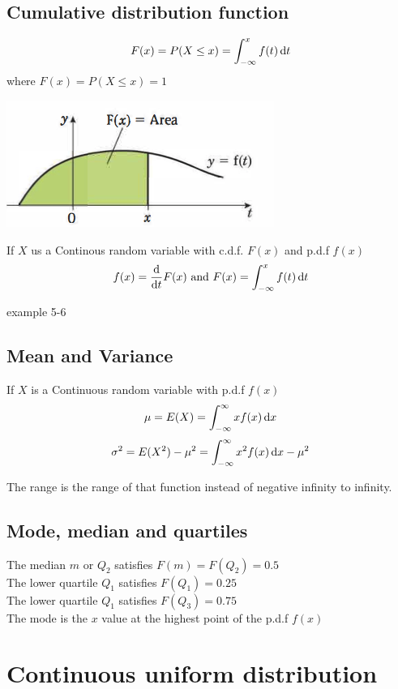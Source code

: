 \documentclass[a4paper]{article}
\begin{document}
\subsection{Cumulative distribution function}
\[
	F(x)=P(X\leq x)=\int_{-\infty}^x f(t) \, \mathrm{d} t
\]
where $F(x)=P(X\leq x)=1$
\begin{center}
	\includegraphics[scale=0.5]{img_S/11_2_intro}
\end{center}
If $X$ us a Continous random variable with c.d.f. $F(x)$ and p.d.f $f(x)$
\[
	f(x)=\frac{\mathrm{d} }{\mathrm{d} t} F(x) \mbox{~and~} F(x)=\int_{-\infty}^x f(t) \, \mathrm{d} t
\]

\begin{eg}
	example 5-6
\end{eg}
\subsection{Mean and Variance}
If $X$ is a Continuous random variable with p.d.f $f(x)$
\[
	\mu=E(X)=\int_{-\infty}^{\infty}x f(x) \, \mathrm{d} x
\]
\[
	\sigma^2=E(X^2)-\mu^2=\int_{-\infty}^{\infty}x^2 f(x) \, \mathrm{d} x-\mu^2
\]
\begin{remark}
	The range is the range of that function instead of negative infinity to infinity.
\end{remark}
\subsection{Mode, median and quartiles}
The median $m$ or $Q_2$ satisfies $F(m)=F(Q_2)=0.5$\\
The lower quartile $Q_1$ satisfies $F(Q_1)=0.25$ \\
The lower quartile $Q_1$ satisfies $F(Q_3)=0.75$ \\

The mode is the $x$ value at the highest point of the p.d.f $f(x)$

\section{Continuous uniform distribution}
\end{document}
